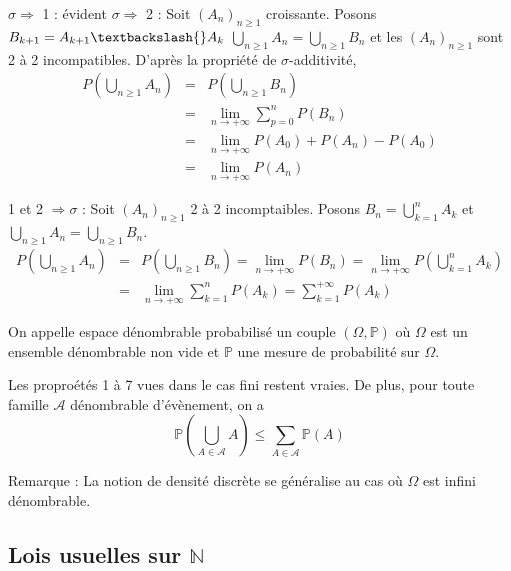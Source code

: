 \begin{dem}
$\sigma \Rightarrow$ 1 : évident
$\sigma \Rightarrow$ 2 : Soit $(A_n)_{n \geqslant 1}$ croissante. Posons $B_{k+1}=A_{k+1} \textbackslash{} A_{k}$
$\bigcup_{n \geqslant 1} A_n = \bigcup_{n \geqslant 1} B_n$ et les $(A_n)_{n \geqslant 1}$ sont 2 à 2 incompatibles.
D'après la propriété de $\sigma$-additivité, 
\begin{eqnarray*}
P(\bigcup_{n \geqslant 1} A_n) &=& P(\bigcup_{n \geqslant 1} B_n) \\
&=& \lim_{n \rightarrow +\infty} \sum_{p=0}^{n} P(B_n) \\
&=& \lim_{n \rightarrow +\infty} P(A_0) + P(A_n) - P(A_0) \\
&=& \lim_{n \rightarrow +\infty} P(A_n)
\end{eqnarray*}

1 et 2 $\Rightarrow \sigma$ : Soit $(A_n)_{n \geqslant 1}$ 2 à 2 incomptaibles. Posons $B_n = \bigcup_{k=1}^n A_k$ et $\bigcup_{n \geqslant 1} A_n = \bigcup_{n \geqslant 1} B_n$.
\begin{eqnarray*}
P(\bigcup_{n \geqslant 1} A_n) &=& P(\bigcup_{n \geqslant 1} B_n) = \lim_{n \rightarrow +\infty} P(B_n) = \lim_{n \rightarrow +\infty} P(\bigcup_{k=1}^n A_k) \\
&=& \lim_{n \rightarrow +\infty} \sum_{k=1}^n P(A_k) = \sum_{k=1}^{+\infty} P(A_k)
\end{eqnarray*}
\end{dem}

\begin{Def}
On appelle espace dénombrable probabilisé un couple $(\Omega, \mathbb{P})$ où $\Omega$ est un ensemble dénombrable non vide et $\mathbb{P}$ une mesure de probabilité sur $\Omega$.
\end{Def}

\begin{Prop}
Les proproétés 1 à 7 vues dans le cas fini restent vraies. De plus, pour toute famille $\mathcal{A}$ dénombrable d'évènement, on a 
\[\mathbb{P}(\bigcup_{A \in \mathcal{A}} A) \leqslant \sum_{A \in \mathcal{A}} \mathbb{P}(A)\]
\end{Prop}

Remarque : La notion de densité discrète se généralise au cas où $\Omega$ est infini dénombrable.

\subsection*{Lois usuelles sur $\mathbb{N}$}
